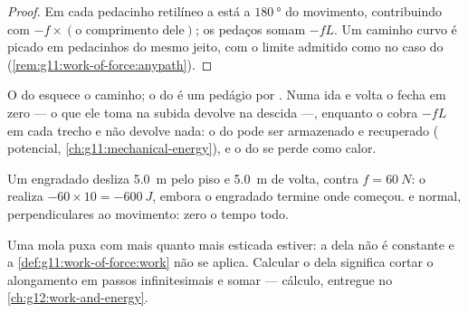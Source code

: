\begin{proof}
Em cada pedacinho retilíneo a  está a $\qty{180}{\degree}$ do
movimento, contribuindo com $-f \times (\text{o comprimento dele})$; os
pedaços somam $-fL$. Um caminho curvo é picado em pedacinhos do mesmo
jeito, com o limite admitido como no caso do 
(\cref{rem:g11:work-of-force:anypath}).
\end{proof}

\begin{remark}\label{rem:g11:work-of-force:divide}
O  do  esquece o caminho; o do  é um pedágio por .
Numa ida e volta o  fecha em zero --- o que ele toma na subida
devolve na descida ---, enquanto o  cobra $-fL$ em cada trecho e
não devolve nada: o  do  pode ser armazenado e recuperado
( potencial, \cref{ch:g11:mechanical-energy}), e o do  se
perde como calor.
\end{remark}

\begin{example}\label{ex:g11:work-of-force:roundtrip}
Um engradado desliza \qty{5.0}{m} pelo piso e \qty{5.0}{m} de volta,
contra $f = \qty{60}{N}$: o  realiza
$-60 \times 10 = \qty{-600}{J}$, embora o engradado termine onde
começou.  e  normal, perpendiculares ao movimento: zero o tempo
todo.
\end{example}

\begin{remark}\label{rem:g11:work-of-force:spring}
Uma mola puxa com mais  quanto mais esticada estiver: a  dela
não é constante e a \cref{def:g11:work-of-force:work} não se aplica.
Calcular o  dela significa cortar o alongamento em passos
infinitesimais e somar --- cálculo, entregue no
\cref{ch:g12:work-and-energy}.
\end{remark}

